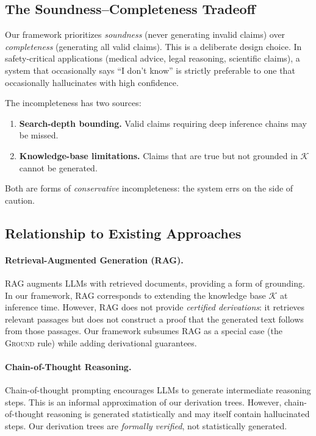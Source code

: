 \documentclass[11pt,a4paper]{article}
\theoremstyle{plain}
\theoremstyle{definition}
\theoremstyle{remark}
\begin{document}
\subsection{The Soundness--Completeness Tradeoff}

Our framework prioritizes \emph{soundness} (never generating invalid claims) over \emph{completeness} (generating all valid claims).
This is a deliberate design choice.
In safety-critical applications (medical advice, legal reasoning, scientific claims), a system that occasionally says ``I don't know'' is strictly preferable to one that occasionally hallucinates with high confidence.

The incompleteness has two sources:
\begin{enumerate}[nosep]
  \item \textbf{Search-depth bounding.} Valid claims requiring deep inference chains may be missed.
  \item \textbf{Knowledge-base limitations.} Claims that are true but not grounded in $\mathcal{K}$ cannot be generated.
\end{enumerate}
Both are forms of \emph{conservative} incompleteness: the system errs on the side of caution.

\subsection{Relationship to Existing Approaches}

\paragraph{Retrieval-Augmented Generation (RAG).}
RAG \cite{lewis2020retrieval} augments LLMs with retrieved documents, providing a form of grounding.
In our framework, RAG corresponds to extending the knowledge base $\mathcal{K}$ at inference time.
However, RAG does not provide \emph{certified derivations}: it retrieves relevant passages but does not construct a proof that the generated text follows from those passages.
Our framework subsumes RAG as a special case (the \textsc{Ground} rule) while adding derivational guarantees.

\paragraph{Chain-of-Thought Reasoning.}
Chain-of-thought prompting \cite{wei2022chain} encourages LLMs to generate intermediate reasoning steps.
This is an informal approximation of our derivation trees.
However, chain-of-thought reasoning is generated statistically and may itself contain hallucinated steps.
Our derivation trees are \emph{formally verified}, not statistically generated.
\end{document}
